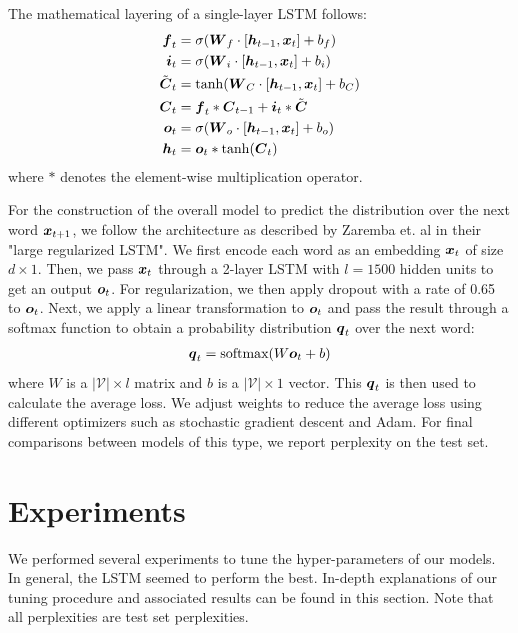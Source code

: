 \documentclass[11pt]{article}
\begin{document}
\noindent
The mathematical layering of a single-layer LSTM follows:
\begin{align*}
\boldsymbol{f}_t &= \sigma(\boldsymbol{W}_f \cdot [\boldsymbol{h}_{t-1}, \boldsymbol{x}_t] + b_f) \\
\boldsymbol{i}_t &= \sigma(\boldsymbol{W}_i \cdot [\boldsymbol{h}_{t-1}, \boldsymbol{x}_t] + b_i) \\
\tilde{\boldsymbol{C}}_t &= \tanh(\boldsymbol{W}_C \cdot [\boldsymbol{h}_{t-1}, \boldsymbol{x}_t]  + b_C) \\
\boldsymbol{C}_t &= \boldsymbol{f}_t * \boldsymbol{C}_{t-1} + \boldsymbol{i}_t * \tilde{\boldsymbol{C}} \\
\boldsymbol{o}_t &= \sigma(\boldsymbol{W}_o \cdot [\boldsymbol{h}_{t-1}, \boldsymbol{x}_t]  + b_o) \\
\boldsymbol{h}_t &= \boldsymbol{o}_t * \tanh(\boldsymbol{C}_t)
\end{align*}
where $*$ denotes the element-wise multiplication operator. 

For the construction of the overall model to predict the distribution over the next word $\boldsymbol{x}_{t+1}$, we follow the architecture as described by Zaremba et. al in their "large regularized LSTM".  We first encode each word as an embedding $\boldsymbol{x}_t$ of size $d \times 1$.  Then, we pass $\boldsymbol{x}_t$ through a 2-layer LSTM with $l =1500$ hidden units to get an output $\boldsymbol{o}_t$.  For regularization, we then apply dropout with a rate of 0.65 to $\boldsymbol{o}_t$.  Next, we apply a linear transformation to $\boldsymbol{o}_t$ and pass the result through a softmax function to obtain a probability distribution $\boldsymbol{q}_t$ over the next word:
\begin{align*}
\boldsymbol{q}_t = \text{softmax} (W \boldsymbol{o}_t + b)
\end{align*} 
where $W$ is a $\lvert \mathcal{V} \rvert \times l$ matrix and $b$ is a $\lvert \mathcal{V} \rvert \times 1$ vector.  This $\boldsymbol{q}_t$ is then used to calculate the average loss.  We adjust weights to reduce the average loss using different optimizers such as stochastic gradient descent and Adam.  For final comparisons between models of this type, we report perplexity on the test set.           


\section{Experiments}

We performed several experiments to tune the hyper-parameters of our models.  In general, the LSTM seemed to perform the best.  In-depth explanations of our tuning procedure and associated results can be found in this section.  Note that all perplexities are test set perplexities. 
\end{document}
